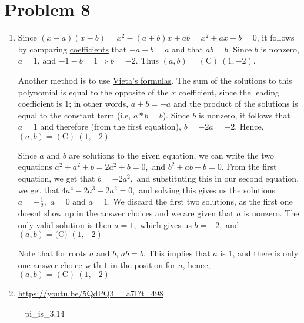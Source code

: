 \documentclass{article}%
\begin{document}
\section*{Problem 8}%
\label{sec:Problem8}%
\begin{enumerate}%
\item%
Since $(x-a)(x-b) = x^2 - (a+b)x + ab = x^2 + ax + b = 0$, it follows by comparing \href{/wiki/index.php/Coefficient}{coefficients} that $-a - b = a$ and that $ab = b$. Since $b$ is nonzero, $a = 1$, and $-1 - b = 1 \Longrightarrow b = -2$. Thus $(a,b) = \boxed{\mathrm{(C)}\ (1,-2)}$.

Another method is to use \href{/wiki/index.php/Vieta%27s_formulas}{Vieta's formulas}. The sum of the solutions to this polynomial is equal to the opposite of the $x$ coefficient, since the leading coefficient is 1; in other words, $a + b = -a$ and the product of the solutions is equal to the constant term (i.e, $a*b = b$). Since $b$ is nonzero, it follows that $a = 1$ and therefore (from the first equation), $b = -2a = -2$. Hence, $(a,b) = \boxed{\mathrm{(C)}\ (1,-2)}$

Since $a$ and $b$ are solutions to the given equation, we can write the two equations $a^2 + a^2 + b = 2a^2 + b = 0,$ and $b^2 + ab + b = 0.$ From the first equation, we get that $b = -2a^2,$ and substituting this in our second equation, we get that $4a^4 - 2a^3 - 2a^2 = 0,$ and solving this gives us the solutions $a = -\frac{1}{2},$ $a = 0$ and $a = 1.$ We discard the first two solutions, as the first one doesnt show up in the answer choices and we are given that $a$ is nonzero. The only valid solution is then $a = 1,$ which gives us $b = -2,$ and $(a, b) = \boxed{\text{(C) } (1, -2)}$

Note that for roots $a$ and $b$, $ab = b$. This implies that $a$ is $1$, and there is only one answer choice with $1$ in the position for $a$, hence, $(a,b) = \boxed{\mathrm{(C)}\ (1,-2)}$

%
\item%
\href{https://youtu.be/5QdPQ3__a7I?t=498}{https://youtu.be/5QdPQ3\_\_a7I?t=498}

~ pi\_is\_3.14

%
\end{enumerate}

%
\end{document}
